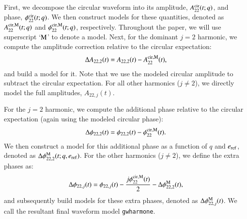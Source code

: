 \documentclass[aps,prd,amsmath,floats,floatfix, twocolumn,
superscriptaddress,nofootinbib,showpacs,longbibliography]{revtex4-1}
\begin{document}
First, we decompose the circular waveform into its amplitude, $A_{22}^{\rm cir}(t;q)$, and phase, $\phi_{22}^{\rm cir}(t;q)$. We then construct models for these quantities, denoted as $A_{22}^{\rm cir,M}(t;q)$ and $\phi_{22}^{\rm cir,M}(t;q)$, respectively. Throughout the paper, we will use superscript `$\rm M$' to denote a model. Next, for the dominant $j=2$ harmonic, we compute the amplitude correction relative to the circular expectation:
\begin{equation}
\Delta A_{22,2}(t) = A_{22,2}(t) - A_{22}^{\rm cir,M}(t),
\end{equation}
and build a model for it. Note that we use the modeled circular amplitude to subtract the circular expectation. For all other harmonics ($j \neq 2$), we directly model the full amplitudes, $A_{22,j}(t)$.

For the $j=2$ harmonic, we compute the additional phase relative to the circular expectation (again using the modeled circular phase):
\begin{equation}
\Delta \phi_{22,2}(t) = \phi_{22,2}(t) - \phi_{22}^{\rm cir,M}(t).
\end{equation}
We then construct a model for this additional phase as a function of $q$ and $e_{\rm ref}$, denoted as $\Delta \phi_{22,2}^{\rm M}(t; q, e_{\rm ref})$.
For the other harmonics ($j \neq 2$), we define the extra phases as:
\begin{equation}
\Delta \phi_{22,j}(t) = \phi_{22,j}(t) - \frac{j\phi_{22}^{\rm cir,M}(t)}{2} - \Delta \phi_{22,2}^{\rm M}(t),
\end{equation}
and subsequently build models for these extra phases, denoted as $\Delta \phi_{22,j}^{\rm M}(t)$. We call the resultant final waveform model \texttt{gwharmone}.
\end{document}
